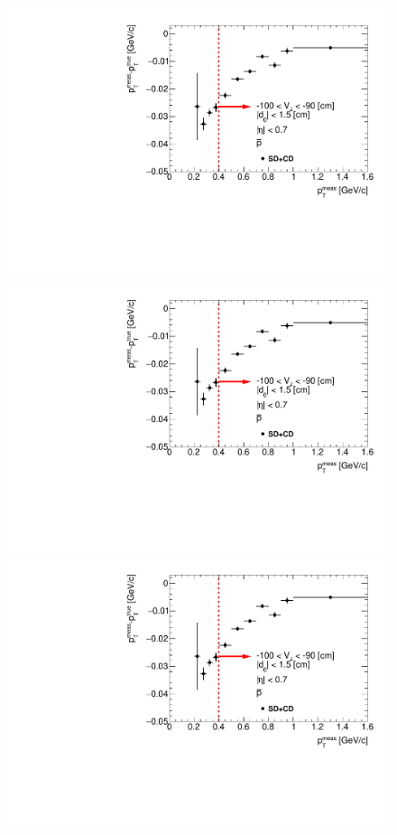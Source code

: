 \begin{figure}[H]
{}~
\parbox{0.329\textwidth}{
  \includegraphics[width=\linewidth,page=4]{graphics/energyLoss/energyLoss3DGlobal_OnePrtAlso.pdf}\\
  \includegraphics[width=\linewidth,page=7]{graphics/energyLoss/energyLoss3DGlobal_OnePrtAlso.pdf}\\
  \includegraphics[width=\linewidth,page=10]{graphics/energyLoss/energyLoss3DGlobal_OnePrtAlso.pdf}\\
}
\end{figure}
